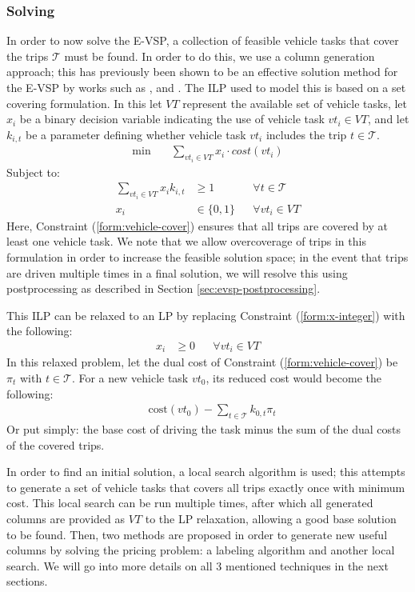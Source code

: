 \documentclass[]{article}
\begin{document}
\subsubsection{Solving}
In order to now solve the E-VSP, a collection of feasible vehicle tasks that cover the trips $\mathcal{T}$ must be found. In order to do this, we use a column generation approach; this has previously been shown to be an effective solution method for the E-VSP by works such as \citet{vanKootenNiekerk2017}, \citet{Zhang2021} and \citet{deVos2024}. The ILP used to model this is based on a set covering formulation. In this let $VT$ represent the available set of vehicle tasks, let $x_{i}$ be a binary decision variable indicating the use of vehicle task $vt_i \in VT$, and let $k_{i,t}$ be a parameter defining whether vehicle task $vt_i$ includes the trip $t \in \mathcal{T}$.
\begin{align}
\min \quad
& \sum_{vt_i \in VT} x_{i} \cdot cost(vt_i)
\end{align}
Subject to:
\begin{align}
\sum_{vt_i \in VT} x_{i}k_{i,t} &\geq 1 && \forall t \in \mathcal{T} \label{form:vehicle-cover}\\
x_{i} &\in \{ 0, 1 \} && \forall vt_i \in VT \label{form:x-integer}
\end{align}
Here, Constraint (\ref{form:vehicle-cover}) ensures that all trips are covered by at least one vehicle task. We note that we allow overcoverage of trips in this formulation in order to increase the feasible solution space; in the event that trips are driven multiple times in a final solution, we will resolve this using postprocessing as described in Section \ref{sec:evsp-postprocessing}.

This ILP can be relaxed to an LP by replacing Constraint (\ref{form:x-integer}) with the following:
\begin{align}
x_{i} &\geq 0 && \forall vt_i \in VT
\end{align}
In this relaxed problem, let the dual cost of Constraint (\ref{form:vehicle-cover}) be $\pi_t$ with $t \in \mathcal{T}$. For a new vehicle task $vt_0$, its reduced cost would become the following:
\begin{align}
& \text{cost}(vt_0) - \sum_{t \in \mathcal{T}} k_{0,t} \pi_{t} 
\end{align}
Or put simply: the base cost of driving the task minus the sum of the dual costs of the covered trips.

In order to find an initial solution, a local search algorithm is used; this attempts to generate a set of vehicle tasks that covers all trips exactly once with minimum cost. This local search can be run multiple times, after which all generated columns are provided as $VT$ to the LP relaxation, allowing a good base solution to be found. Then, two methods are proposed in order to generate new useful columns by solving the pricing problem: a labeling algorithm and another local search. We will go into more details on all 3 mentioned techniques in the next sections. 
\end{document}
